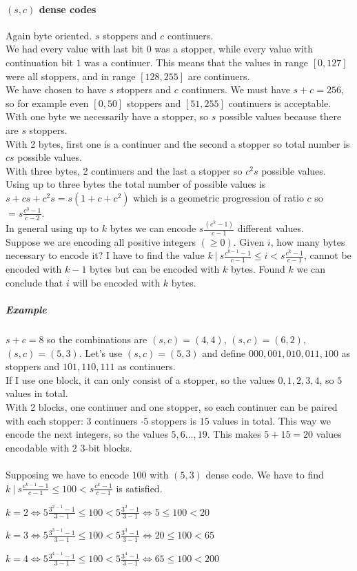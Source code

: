 \documentclass[10pt]{report}
\begin{document}
\paragraph{$(s, c)$ dense codes} Again byte oriented. $s$ stoppers and $c$ continuers.\\
We had every value with last bit $0$ was a stopper, while every value with continuation bit $1$ was a continuer. This means that the values in range $[0, 127]$ were all stoppers, and in range $[128, 255]$ are continuers.\\
We have chosen to have $s$ stoppers and $c$ continuers. We must have $s + c = 256$, so for example even $[0,50]$ stoppers and $[51, 255]$ continuers is acceptable. With one byte we necessarily have a stopper, so $s$ possible values because there are $s$ stoppers.\\
With 2 bytes, first one is a continuer and the second a stopper so total number is $cs$ possible values.\\
With three bytes, 2 continuers and the last a stopper so $c^2 s$ possible values.\\
Using up to three bytes the total number of possible values is $s + cs + c^2s = s(1 + c + c^2)$ which is a geometric progression of ratio $c$ so $=s\frac{c^3 - 1}{c-2}$.\\
In general using up to $k$ bytes we can encode $s\frac{(c^k - 1)}{c-1}$ different values.\\
Suppose we are encoding all positive integers $(\geq 0)$. Given $i$, how many bytes necessary to encode it? I have to find the value $k\:|\:s\frac{c^{k-1} - 1}{c-1}\leq i < s\frac{c^k-1}{c-1}$, cannot be encoded with $k-1$ bytes but can be encoded with $k$ bytes. Found $k$ we can conclude that $i$ will be encoded with $k$ bytes.
\subparagraph{Example} $s+c = 8$ so the combinations are $(s, c) = (4, 4)$, $(s, c) = (6, 2)$, $(s, c) = (5, 3)$. Let's use $(s,c) = (5,3)$ and define $000,001,010,011,100$ as stoppers and $101,110,111$ as continuers.\\
If I use one block, it can only consist of a stopper, so the values $0,1,2,3,4$, so $5$ values in total.\\
With 2 blocks, one continuer and one stopper, so each continuer can be paired with each stopper: $3$ continuers $\cdot 5$ stoppers is $15$ values in total. This way we encode the next integers, so the values $5,6\ldots,19$. This makes $5+15 = 20$ values encodable with $2$ $3$-bit blocks.\\\\
Supposing we have to encode $100$ with $(5,3)$ dense code. We have to find $k\:|\:s\frac{c^{k-1}-1}{c-1}\leq 100 < s\frac{c^k-1}{c-1}$ is satisfied.\begin{list}{}{}
	\item $k=2 \Leftrightarrow 5\frac{3^{2-1}-1}{3-1}\leq 100 < 5\frac{3^2-1}{3-1} \Leftrightarrow 5 \leq 100 < 20$
	\item $k=3 \Leftrightarrow 5\frac{3^{3-1}-1}{3-1}\leq 100 < 5\frac{3^3-1}{3-1} \Leftrightarrow 20 \leq 100 < 65$
	\item $k=4 \Leftrightarrow 5\frac{3^{4-1}-1}{3-1}\leq 100 < 5\frac{3^4-1}{3-1} \Leftrightarrow 65 \leq 100 < 200$
\end{list}
\end{document}
